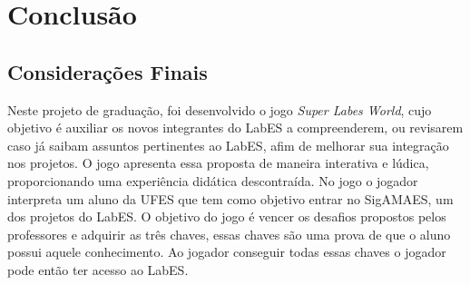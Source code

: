 \chapter{Conclusão}
\label{sec-conclusoes}




\section{Considerações Finais}
\label{sec-conclusoes-consideracoes}


Neste projeto de graduação, foi desenvolvido o jogo \textit{Super Labes World}, cujo objetivo é auxiliar os novos integrantes do LabES a compreenderem, ou revisarem caso já saibam assuntos pertinentes ao LabES, afim de melhorar sua integração nos projetos. O jogo apresenta essa proposta de maneira interativa e lúdica, proporcionando uma experiência didática descontraída. No jogo o jogador interpreta um aluno da UFES que tem como objetivo entrar no SigAMAES, um dos projetos do LabES. O objetivo do jogo é vencer os desafios propostos pelos professores e adquirir as três chaves, essas chaves são uma prova de que o aluno possui aquele conhecimento. Ao jogador conseguir todas essas chaves o jogador pode então ter acesso ao LabES.




